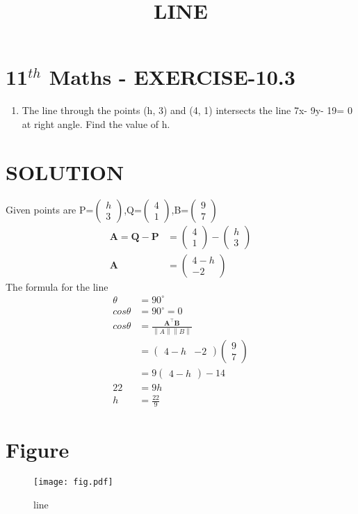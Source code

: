 \documentclass[12pt]{article}
\newcommand{\myvec}[1]{\ensuremath{\begin{pmatrix}#1\end{pmatrix}}}
\providecommand{\norm}[1]{\left\lVert#1\right\rVert}
\let\vec\mathbf
\begin{document}
\begin{center}
\title{\textbf{LINE}}
\date{\vspace{-5ex}} %
\maketitle
\end{center}

\section{11$^{th}$ Maths - EXERCISE-10.3}
\begin{enumerate}
\item The line through the points (h, 3) and (4, 1) intersects the line 7x- 9y- 19= 0 at right angle. Find the value of h.
\end{enumerate}
\section{SOLUTION}
Given points are P=\myvec{h\\ 3},Q=\myvec{4\\ 1},B=\myvec{9\\ 7}
\begin{align}
\vec{A}=\vec{Q}-\vec{P}&=\myvec{4\\ 1}-\myvec{h\\ 3}\\
\vec{A}&=\myvec{4-h\\ -2}
\end{align}
The formula for the line 
\begin{align}
\theta&=90^\circ\\
cos\theta&=90^\circ=0\\
cos\theta&=\frac{\vec{A}^\top\vec{B}}{\norm{A}\norm{B}}\\
&=\myvec{4-h& -2}\myvec{9\\ 7}\\
&=9\myvec{4-h}-14\\
22&=9h\\
h&=\frac{22}{9}
\end{align}
\section{Figure}
\begin{figure}[h]
\centering
\texttt{[image: fig.pdf]}
\caption{line}
		\label{fig:Figure}
\end{figure}
\end{document}
